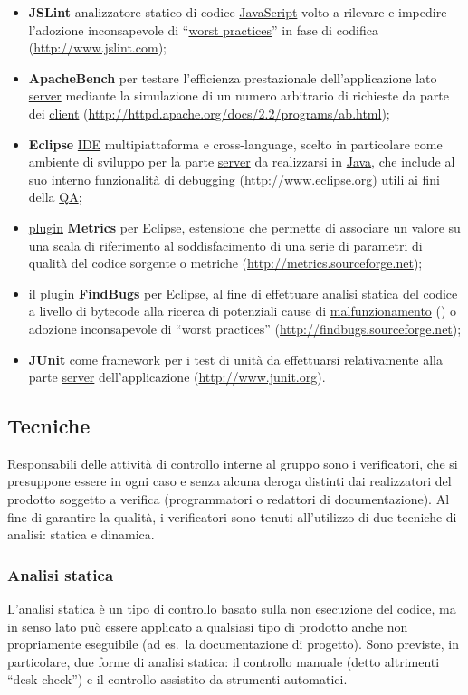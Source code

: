 {\begin{itemize}
  \item \textbf{JSLint} analizzatore statico di codice \underline{JavaScript} volto a rilevare e impedire l'adozione inconsapevole di ``\underline{worst practices}'' in fase di codifica (\url{http://www.jslint.com});
  \item \textbf{ApacheBench} per testare l'efficienza prestazionale dell'applicazione lato \underline{server} mediante la simulazione di un numero arbitrario di richieste da parte dei \underline{client} (\url{http://httpd.apache.org/docs/2.2/programs/ab.html});
  \item \textbf{Eclipse} \underline{IDE} multipiattaforma e cross-language, scelto in particolare come ambiente di sviluppo per la parte \underline{server} da realizzarsi in \underline{Java}, che include al suo interno funzionalità di debugging (\url{http://www.eclipse.org}) utili ai fini della \underline{QA};
  \item \underline{plugin} \textbf{Metrics} per Eclipse, estensione che permette di associare un valore su una scala di riferimento al soddisfacimento di una serie di parametri di qualità del codice sorgente o metriche (\url{http://metrics.sourceforge.net});
  \item il \underline{plugin} \textbf{FindBugs} per Eclipse, al fine di effettuare analisi statica del codice a livello di bytecode alla ricerca di potenziali cause di \underline{malfunzionamento} () o adozione inconsapevole di ``worst practices'' (\url{http://findbugs.sourceforge.net});
  \item \textbf{JUnit} come framework per i test di unità da effettuarsi relativamente alla parte \underline{server} dell'applicazione (\url{http://www.junit.org}).
\end{itemize}

\subsection{Tecniche}
Responsabili delle attività di controllo interne al gruppo sono i verificatori, che si presuppone essere in ogni caso e senza alcuna deroga distinti dai realizzatori del prodotto soggetto a verifica (programmatori o redattori di documentazione). Al fine di garantire la qualità, i verificatori sono tenuti all'utilizzo di due tecniche di analisi: statica e dinamica.

\subsubsection{Analisi statica}
\label{analisi_statica}
L'analisi statica è un tipo di controllo basato sulla non esecuzione del codice, ma in senso lato può essere applicato a qualsiasi tipo di prodotto anche non propriamente eseguibile (ad es.~la documentazione di progetto). Sono previste, in particolare, due forme di analisi statica: il controllo manuale (detto altrimenti ``desk check'') e il controllo assistito da strumenti automatici.

}
